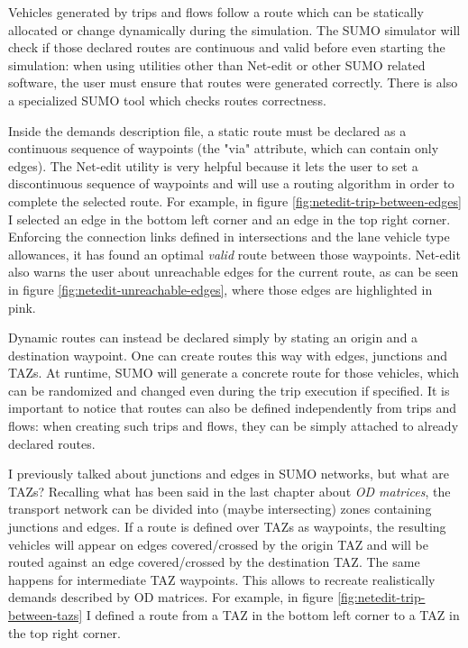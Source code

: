 Vehicles generated by trips and flows follow a route which can be statically allocated or change dynamically during the simulation. The SUMO simulator will check if those declared routes are continuous and valid before even starting the simulation: when using utilities other than Net-edit or other SUMO related software, the user must ensure that routes were generated correctly. There is also a specialized SUMO tool which checks routes correctness.

Inside the demands description file, a static route must be declared as a continuous sequence of waypoints (the "via" attribute, which can contain only edges). The Net-edit utility is very helpful because it lets the user to set a discontinuous sequence of waypoints and will use a routing algorithm in order to complete the selected route. For example, in figure \ref{fig:netedit-trip-between-edges} I selected an edge in the bottom left corner and an edge in the top right corner. Enforcing the connection links defined in intersections and the lane vehicle type allowances, it has found an optimal \textit{valid} route between those waypoints. Net-edit also warns the user about unreachable edges for the current route, as can be seen in figure \ref{fig:netedit-unreachable-edges}, where those edges are highlighted in pink.


Dynamic routes can instead be declared simply by stating an origin and a destination waypoint. One can create routes this way with edges, junctions and TAZs. At runtime, SUMO will generate a concrete route for those vehicles, which can be randomized and changed even during the trip execution if specified. It is important to notice that routes can also be defined independently from trips and flows: when creating such trips and flows, they can be simply attached to already declared routes.

I previously talked about junctions and edges in SUMO networks, but what are TAZs? Recalling what has been said in the last chapter about \textit{OD matrices}, the transport network can be divided into (maybe intersecting) zones containing junctions and edges. If a route is defined over TAZs as waypoints, the resulting vehicles will appear on edges covered/crossed by the origin TAZ and will be routed against an edge covered/crossed by the destination TAZ. The same happens for intermediate TAZ waypoints. This allows to recreate realistically demands described by OD matrices. For example, in figure \ref{fig:netedit-trip-between-tazs} I defined a route from a TAZ in the bottom left corner to a TAZ in the top right corner.

